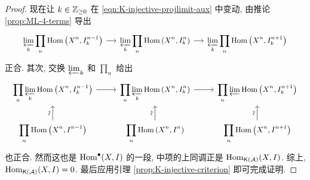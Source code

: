 \begin{proof}
	现在让 $k \in \mathbb{Z}_{\geq 0}$ 在 \eqref{eqn:K-injective-projlimit-aux} 中变动, 由推论 \ref{prop:ML-4-terms} 导出
	\[\begin{tikzcd}
		[column sep=small, every cell/.append style = {font = \small}]
		\displaystyle\varprojlim_k \displaystyle\prod_n \Hom\left( X^n, I_k^{n-1} \right) \arrow[r] & \displaystyle\varprojlim_k \displaystyle\prod_n \Hom\left( X^n, I_k^n \right) \arrow[r] & \displaystyle\varprojlim_k \displaystyle\prod_n \Hom\left( X^n, I_k^{n+1} \right)
	\end{tikzcd}\]
	正合. 其次, 交换 $\varprojlim_k$ 和 $\prod_n$ 给出
	\[\begin{tikzcd}
		[every cell/.append style = {font = \small}]
		\displaystyle\prod_n \varprojlim_k \Hom\left( X^n, I_k^{n-1} \right) \arrow[r] & \displaystyle\prod_n \varprojlim_k \Hom\left( X^n, I_k^n \right) \arrow[r] & \displaystyle\prod_n \varprojlim \Hom\left( X^n, I_k^{n+1} \right) \\
		\displaystyle\prod_n \Hom\left( X^n, I^{n-1} \right) \arrow[u, "\sim" sloped] & \displaystyle\prod_n \Hom\left( X^n, I^n \right) \arrow[u, "\sim" sloped] & \displaystyle\prod_n \Hom\left( X^n, I^{n+1} \right) \arrow[u, "\sim" sloped]
	\end{tikzcd}\]
	也正合. 然而这也是 $\operatorname{Hom}^\bullet(X, I)$ 的一段, 中项的上同调正是 $\operatorname{Hom}_{\mathsf{K}(\mathcal{A})}(X, I)$. 综上, $\operatorname{Hom}_{\mathsf{K}(\mathcal{A})}(X, I) = 0$. 最后应用引理 \ref{prop:K-injective-criterion} 即可完成证明.
\end{proof}

